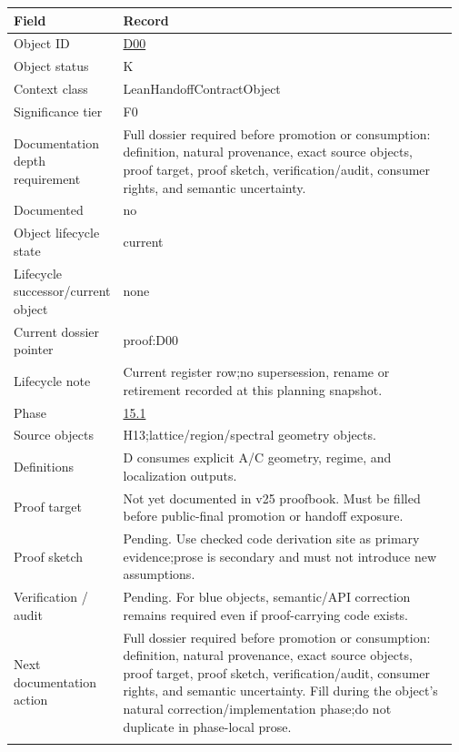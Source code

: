 \begin{longtable}{L{0.16\linewidth} L{0.81\linewidth}}
\hline
\textbf{Field} & \textbf{Record}\\
\hline
Object ID & \hyperlink{object-row-D00}{D00}\\
\hline\addlinespace[0.20em]
Object status & K\\
\hline\addlinespace[0.20em]
Context class & LeanHandoffContractObject\\
\hline\addlinespace[0.20em]
Significance tier & F0\\
\hline\addlinespace[0.20em]
Documentation depth requirement & Full dossier required before promotion or consumption: definition, natural provenance, exact source objects, proof target, proof sketch, verification/\allowbreak{}audit, consumer rights, and semantic uncertainty.\\
\hline\addlinespace[0.20em]
Documented & no\\
\hline\addlinespace[0.20em]
Object lifecycle state & current\\
\hline\addlinespace[0.20em]
Lifecycle successor/\allowbreak{}current object & none\\
\hline\addlinespace[0.20em]
Current dossier pointer & proof:D00\\
\hline\addlinespace[0.20em]
Lifecycle note & Current register row;\newline no supersession, rename or retirement recorded at this planning snapshot.\\
\hline\addlinespace[0.20em]
Phase & \hyperlink{phase-row-15-1}{15.1}\\
\hline\addlinespace[0.20em]
Source objects & H13;\newline lattice/\allowbreak{}region/\allowbreak{}spectral geometry objects.\\
\hline\addlinespace[0.20em]
Definitions & D consumes explicit A/\allowbreak{}C geometry, regime, and localization outputs.\\
\hline\addlinespace[0.20em]
Proof target & Not yet documented in v25 proofbook. Must be filled before public-final promotion or handoff exposure.\\
\hline\addlinespace[0.20em]
Proof sketch & Pending. Use checked code derivation site as primary evidence;\newline prose is secondary and must not introduce new assumptions.\\
\hline\addlinespace[0.20em]
Verification /\allowbreak{} audit & Pending. For blue objects, semantic/\allowbreak{}API correction remains required even if proof-carrying code exists.\\
\hline\addlinespace[0.20em]
Next documentation action & Full dossier required before promotion or consumption: definition, natural provenance, exact source objects, proof target, proof sketch, verification/\allowbreak{}audit, consumer rights, and semantic uncertainty. Fill during the object's natural correction/\allowbreak{}implementation phase;\newline do not duplicate in phase-local prose.\\
\hline\addlinespace[0.20em]
\end{longtable}

